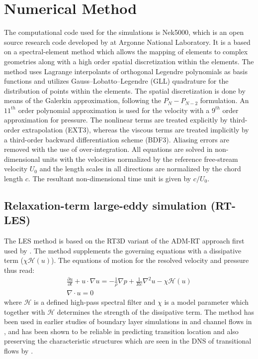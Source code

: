 \section{Numerical Method}

The computational code used for the simulations is Nek5000, which is an open source research code developed by \cite{nek5000} at Argonne National Laboratory. It is a based on a spectral-element method which allows the mapping of elements to complex geometries along with a high order spatial discretization within the elements. The method uses Lagrange interpolants of orthogonal Legendre polynomials as basis functions and utilizes Gauss--Lobatto--Legendre (GLL) quadrature for the distribution of points within the elements. The spatial discretization is done by means of the Galerkin approximation, following the $P_{N}-P_{N-2}$ formulation. An $11^{th}$ order polynomial approximation is used for the velocity with a $9^{th}$ order approximation for pressure. The nonlinear terms are treated explicitly by third-order extrapolation (EXT3), whereas the viscous terms are treated implicitly by a third-order backward differentiation scheme (BDF3). Aliasing errors are removed with the use of over-integration. All equations are solved in non-dimensional units with the velocities normalized by the reference free-stream velocity $U_{0}$ and the length scales in all directions are normalized by the chord length $c$. The resultant non-dimensional time unit is given by $c/U_{0}$.
\subsection{Relaxation-term large-eddy simulation (RT-LES)}

The LES method is based on the RT3D variant of the ADM-RT approach first used by \cite{schlatter04}. The method supplements the governing equations with a dissipative term ($\chi\mathcal{H}(u)$). The equations of motion for the resolved velocity and pressure thus read:
\begin{eqnarray}
\frac{\partial u}{\partial t} + u\cdot\nabla u =  - \frac{1}{\rho}\nabla p + \frac{1}{Re}\nabla^{2}u -\chi\mathcal{H}(u) \\
\nabla\cdot u = 0
\end{eqnarray}
where $\mathcal{H}$ is a defined high-pass spectral filter and $\chi$ is a model parameter which together with $\mathcal{H}$ determines the strength of the dissipative term. The method has been used in earlier studies of boundary layer simulations in \cite{eitel14} and channel flows in \cite{schlatter06}, and has been shown to be reliable in predicting transition location and also preserving the characteristic structures which are seen in the DNS of transitional flows by \cite{schlatter06}.

